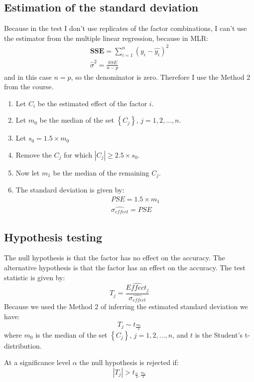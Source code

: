 \documentclass{article}
\begin{document}
\subsection{Estimation of the standard deviation}

Because in the test I don't use replicates of the factor combinations, I can't use the estimator from the multiple linear regression, because in MLR:
\begin{align}
    \mathbf{SSE} = \sum_{i=1}^{n} \left(y_i - \hat{y_i} \right)^2 \\
    \hat{\sigma}^2 = \frac{SSE}{n-p}
\end{align}
and in this case $n=p$, so the denominator is zero. Therefore I use the Method 2 from the course.
\begin{enumerate}
    \item Let $C_i$ be the estimated effect of the factor $i$.
    \item Let $m_0$ be the median of the set $\left\{C_j\right\}$, $j=1,2,\dots,n$.
    \item Let $s_0=1.5\times m_0$
    \item Remove the $C_j$ for which $|C_j|\geq2.5\times s_0$.
    \item Now let $m_1$ be the median of the remaining $C_j$.
    \item The standard deviation is given by:
          \begin{align}
              PSE = 1.5\times m_1 \\
              \widehat{\sigma_{effect}} = PSE
          \end{align}
\end{enumerate}

\subsection{Hypothesis testing}

The null hypothesis is that the factor has no effect on the accuracy. The alternative hypothesis is that the factor has an effect on the accuracy. The test statistic is given by:
\begin{equation}
    T_j = \frac{\widehat{Effect_j}}{\widehat{\sigma_{effect}}}
\end{equation}
Because we used the Method 2 of inferring the estimated standard deviation we have:
\begin{equation}
    T_j \sim t_{\frac{m_0}{3}}
\end{equation}
where $m_0$ is the median of the set $\left\{C_j\right\}$, $j=1,2,\dots,n$, and $t$ is the Student's t-distribution.

At a significance level $\alpha$ the null hypothesis is rejected if:
\begin{equation}
    |T_j| > t_{\frac{\alpha}{2}, \frac{m_0}{3}}
\end{equation}
\end{document}
